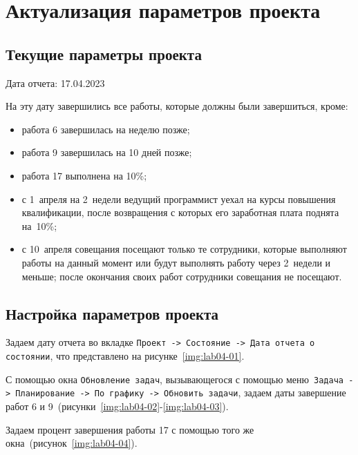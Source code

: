 \clearpage
\section{Актуализация параметров проекта}

\subsection{Текущие параметры проекта}

Дата отчета: 17.04.2023

На эту дату завершились все работы, которые должны были завершиться, кроме:

\begin{itemize}
    \item работа 6 завершилась на неделю позже;
    \item работа 9 завершилась на 10 дней позже;
    \item работа 17 выполнена на 10\%;
    \item с 1~апреля на 2~недели ведущий программист уехал на курсы повышения
	  квалификации, после возвращения с которых его заработная плата
	  поднята на~10\%;
    \item с 10~апреля совещания посещают только те сотрудники, которые
        выполняют работы на данный момент или будут выполнять работу через
        2~недели и меньше; после окончания своих работ сотрудники совещания не
        посещают.
\end{itemize}

\subsection{Настройка параметров проекта}

Задаем дату отчета во вкладке \texttt{Проект -> Состояние -> Дата отчета о
состоянии}, что представлено на рисунке~\ref{img:lab04-01}.


С помощью окна \texttt{Обновление задач}, вызывающегося с помощью
меню~\texttt{Задача -> Планирование -> По графику -> Обновить задачи}, задаем
даты завершение работ 6 и 9~(рисунки~\ref{img:lab04-02}-\ref{img:lab04-03}).



Задаем процент завершения работы 17 с помощью того же окна~(рисунок~\ref{img:lab04-04}).

